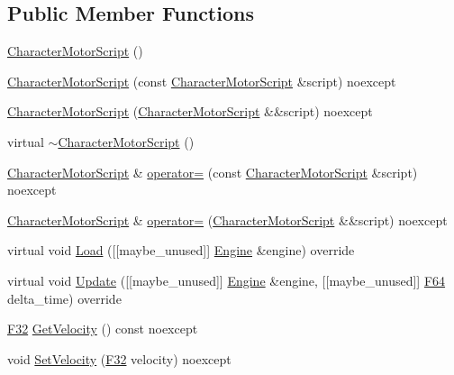 \subsection*{Public Member Functions}
\begin{DoxyCompactItemize}
\item 
\hyperlink{classmage_1_1script_1_1_character_motor_script_ac5147e7eca438fe01cc0bedb2ce0a750}{Character\+Motor\+Script} ()
\item 
\hyperlink{classmage_1_1script_1_1_character_motor_script_a22c2bc0693a38f12182234ba842aa6f2}{Character\+Motor\+Script} (const \hyperlink{classmage_1_1script_1_1_character_motor_script}{Character\+Motor\+Script} \&script) noexcept
\item 
\hyperlink{classmage_1_1script_1_1_character_motor_script_ad822459ba8d2bbd5a30d598c41c5a281}{Character\+Motor\+Script} (\hyperlink{classmage_1_1script_1_1_character_motor_script}{Character\+Motor\+Script} \&\&script) noexcept
\item 
virtual \hyperlink{classmage_1_1script_1_1_character_motor_script_a83ed3c2fcb60cef046499fd9c44f86ee}{$\sim$\+Character\+Motor\+Script} ()
\item 
\hyperlink{classmage_1_1script_1_1_character_motor_script}{Character\+Motor\+Script} \& \hyperlink{classmage_1_1script_1_1_character_motor_script_aec26db7e08e315cf2461e860b1eaee4e}{operator=} (const \hyperlink{classmage_1_1script_1_1_character_motor_script}{Character\+Motor\+Script} \&script) noexcept
\item 
\hyperlink{classmage_1_1script_1_1_character_motor_script}{Character\+Motor\+Script} \& \hyperlink{classmage_1_1script_1_1_character_motor_script_a284b9ecfd595278062cf3a16ebd90f43}{operator=} (\hyperlink{classmage_1_1script_1_1_character_motor_script}{Character\+Motor\+Script} \&\&script) noexcept
\item 
virtual void \hyperlink{classmage_1_1script_1_1_character_motor_script_a20699adf280bed4bfadd4a89d7df33c1}{Load} (\mbox{[}\mbox{[}maybe\+\_\+unused\mbox{]}\mbox{]} \hyperlink{classmage_1_1_engine}{Engine} \&engine) override
\item 
virtual void \hyperlink{classmage_1_1script_1_1_character_motor_script_a1b74be732ab9124abe53b8890cceb365}{Update} (\mbox{[}\mbox{[}maybe\+\_\+unused\mbox{]}\mbox{]} \hyperlink{classmage_1_1_engine}{Engine} \&engine, \mbox{[}\mbox{[}maybe\+\_\+unused\mbox{]}\mbox{]} \hyperlink{namespacemage_ad26233bbec640deda836e572c1a23708}{F64} delta\+\_\+time) override
\item 
\hyperlink{namespacemage_aa97e833b45f06d60a0a9c4fc22ae02c0}{F32} \hyperlink{classmage_1_1script_1_1_character_motor_script_a24edb3337af40e7326c424bc6b93c3fa}{Get\+Velocity} () const noexcept
\item 
void \hyperlink{classmage_1_1script_1_1_character_motor_script_a51c9b8317670fc0ae554bfb0cac11aee}{Set\+Velocity} (\hyperlink{namespacemage_aa97e833b45f06d60a0a9c4fc22ae02c0}{F32} velocity) noexcept
\end{DoxyCompactItemize}
